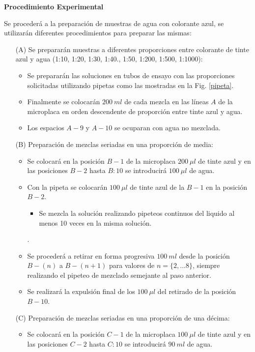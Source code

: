     
\textbf{\textcolor{azul50}{Procedimiento Experimental}}

Se procederá a la preparación de muestras de agua con colorante azul, se utilizarán diferentes procedimientos para preparar las mismas:
\begin{itemize}
    \item[(A)] Se prepararán muestras a diferentes proporciones entre colorante de tinte azul y agua (1:10, 1:20, 1:30, 1:40., 1:50, 1:200, 1:500, 1:1000):
    \begin{itemize}
        \item Se prepararán las soluciones en tubos de ensayo con las proporciones solicitadas utilizando pipetas como las mostradas en la Fig. \ref{pipeta}.
        \item Finalmente se colocarán $200~ml$ de cada mezcla en las líneas $A$ de la microplaca en orden descendente de proporción entre tinte azul y agua.
        \item Los espacios $A-9$ y $A-10$ se ocuparan con agua no mezclada.
    \end{itemize} 
    \item[(B)] Preparación de mezclas seriadas en una proporción de media:
    \begin{itemize}
        \item Se colocará en la posición $B-1$ de la microplaca $200 ~\mu  l$ de tinte azul y en las posiciones $B-2$ hasta $B:10$ se introducirá $100~\mu l$ de agua.
        \item Con la pipeta se colocarán $100~\mu l$ de tinte azul de la $B-1$ en la posición $B-2$.
        \begin{itemize}
            \item Se mezcla la solución realizando pipeteos continuos del liquido al menos 10 veces en la misma solución.
        \end{itemize}. 
        \item Se procederá a retirar en forma progresiva $100 ~ml$ desde la posición $B-(n)$ a $B-(n+1)$ para valores de $n=\{2, ...8\}$, siempre realizando el pipeteo de mezclado semejante al paso anterior. 
        \item Se realizará la expulsión final de los $100~\mu l$ del retirado de la posición $B-10$.
    \end{itemize}
    \item[(C)] Preparación de mezclas seriadas en una proporción de una décima:
    \begin{itemize}
        \item Se colocará en la posición $C-1$ de la microplaca $100~\mu l$ de tinte azul y en las posiciones $C-2$ hasta $C:10$ se introducirá $90~ml$ de agua.

\end{itemize}
\end{itemize}
